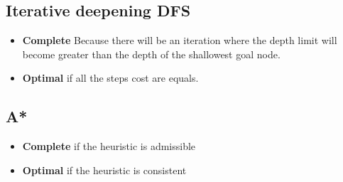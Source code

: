   \subsection{Iterative deepening DFS}
\begin{itemize}
  \item \textbf{Complete} Because there will be an iteration where the depth limit will become greater than the depth of the shallowest goal node.
  \item \textbf{Optimal} if all the steps cost are equals.
\end{itemize}

  \subsection{A*}
\begin{itemize}
  \item \textbf{Complete} if the heuristic is admissible 
  \item \textbf{Optimal} if the heuristic is consistent
\end{itemize}

